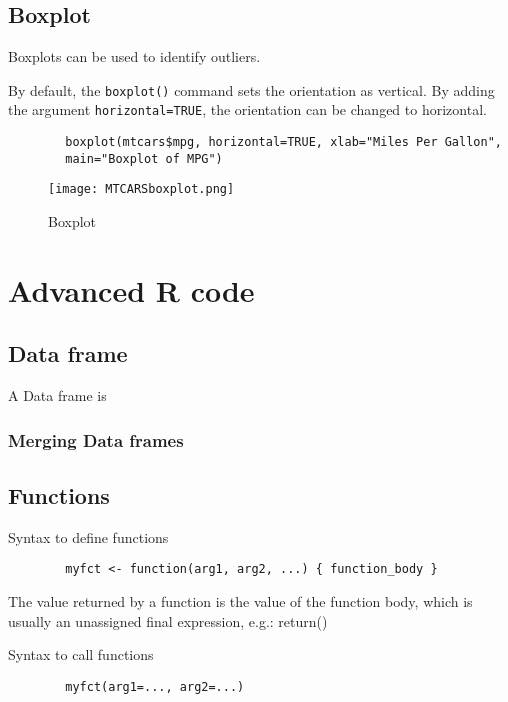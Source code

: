 \documentclass[a4paper,12pt]{article}
\begin{document}
	
	
	\section{Boxplot}
	Boxplots can be used to identify outliers.
	
	By default, the \texttt{boxplot()} command sets the orientation as vertical. By adding the argument \texttt{horizontal=TRUE}, the orientation can be changed to horizontal.
	\large
	\begin{framed}
		\begin{verbatim}
		boxplot(mtcars$mpg, horizontal=TRUE, xlab="Miles Per Gallon",
		main="Boxplot of MPG")
		\end{verbatim}
	\end{framed}\large
	
	\begin{figure}
		\texttt{[image: MTCARSboxplot.png]}\\
		\caption{Boxplot}\label{boxplot}
	\end{figure}
	
	
	
	\newpage
	\chapter{Advanced R code}
	\section{Data frame}
	A Data frame is
	\subsection{Merging Data frames}
	
	\section{Functions}
	Syntax to define functions
	
	\begin{framed}
		\begin{verbatim}
		myfct <- function(arg1, arg2, ...) { function_body }
		\end{verbatim}
	\end{framed}
	The value returned by a function is the value of the function body, which is usually an unassigned final expression, e.g.: return()
	
	Syntax to call functions
	\begin{framed}
		\begin{verbatim}
		myfct(arg1=..., arg2=...)
		\end{verbatim}
	\end{framed}
	
\end{document}
